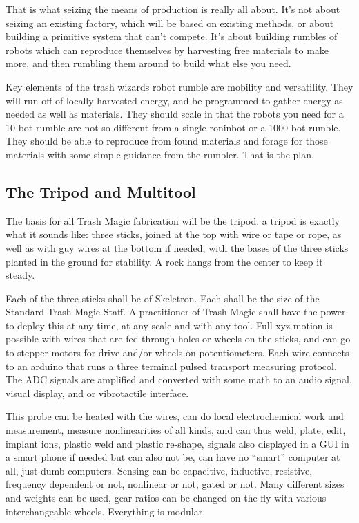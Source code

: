 That is what seizing the means of production is really all about. It's
not about seizing an existing factory, which will be based on existing
methods, or about building a primitive system that can't compete. It's
about building rumbles of robots which can reproduce themselves by
harvesting free materials to make more, and then rumbling them around to
build what else you need.

Key elements of the trash wizards robot rumble are mobility and
versatility. They will run off of locally harvested energy, and be
programmed to gather energy as needed as well as materials. They should
scale in that the robots you need for a 10 bot rumble are not so
different from a single roninbot or a 1000 bot rumble. They should be
able to reproduce from found materials and forage for those materials
with some simple guidance from the rumbler. That is the plan.

\subsection{The Tripod and Multitool}\label{the-tripod-and-multitool}

The basis for all Trash Magic fabrication will be the tripod. a tripod
is exactly what it sounds like: three sticks, joined at the top with
wire or tape or rope, as well as with guy wires at the bottom if needed,
with the bases of the three sticks planted in the ground for stability.
A rock hangs from the center to keep it steady.

Each of the three sticks shall be of Skeletron. Each shall be the size
of the Standard Trash Magic Staff. A practitioner of Trash Magic shall
have the power to deploy this at any time, at any scale and with any
tool. Full xyz motion is possible with wires that are fed through holes
or wheels on the sticks, and can go to stepper motors for drive and/or
wheels on potentiometers. Each wire connects to an arduino that runs a
three terminal pulsed transport measuring protocol. The ADC signals are
amplified and converted with some math to an audio signal, visual
display, and or vibrotactile interface.

This probe can be heated with the wires, can do local electrochemical
work and measurement, measure nonlinearities of all kinds, and can thus
weld, plate, edit, implant ions, plastic weld and plastic re-shape,
signals also displayed in a GUI in a smart phone if needed but can also
not be, can have no ``smart'' computer at all, just dumb computers.
Sensing can be capacitive, inductive, resistive, frequency dependent or
not, nonlinear or not, gated or not. Many different sizes and weights
can be used, gear ratios can be changed on the fly with various
interchangeable wheels. Everything is modular.

